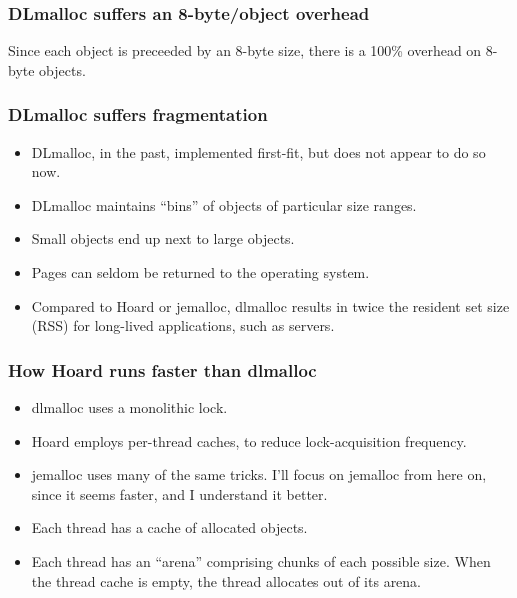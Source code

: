 \documentclass[xcolor=dvipsnames,14pt]{beamer}
\begin{document}
\begin{frame}
\frametitle{DLmalloc suffers an 8-byte/object overhead}

Since each object is preceeded by an 8-byte size, there is a 100\%
overhead on 8-byte objects.

\end{frame}

\begin{frame}
\frametitle{DLmalloc suffers fragmentation}

\begin{itemize}
\item DLmalloc, in the past, implemented first-fit, but does not appear to do so now.

\item DLmalloc maintains ``bins'' of objects of particular size ranges.

\item Small objects end up next to large objects.

\item Pages can seldom be returned to the operating system.

\item Compared to Hoard or jemalloc, dlmalloc results in twice the
  resident set size (RSS) for long-lived applications, such as
  servers.
\end{itemize}

\end{frame}

\begin{frame}
\frametitle{How Hoard runs faster than dlmalloc}

\begin{itemize}
\item dlmalloc uses a monolithic lock.
\item Hoard employs per-thread caches, to reduce lock-acquisition frequency.
\item jemalloc uses many of the same tricks.  I'll focus on jemalloc
  from here on, since it seems faster, and I understand it better.
\item Each thread has a cache of allocated objects.
\item Each thread has an ``arena'' comprising chunks of each possible size.  When the thread cache is empty, the thread allocates out of its arena.
\end{itemize}

\end{frame}
\end{document}
